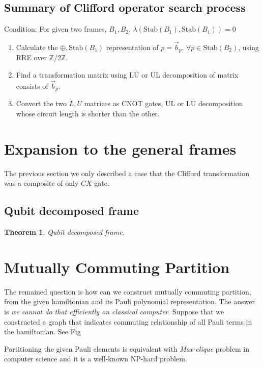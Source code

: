 \documentclass[a4paper,12pt]{article}
\newtheorem{theorem}{Theorem}
\begin{document}
\subsection{Summary of Clifford operator search process}

Condition: For given two frames, $B_1, B_2$, $\lambda(\mbox{Stab}(B_1), \mbox{Stab}(B_1)) = 0$

\begin{enumerate}
    \item Calculate the $\oplus, \mbox{Stab}(B_1)$ representation of $p = \vec{b}_p$, $\forall p \in \mbox{Stab}(B_2)$, using RRE over $\mathbb{Z}/2 \mathbb{Z}$.
    \item Find a transformation matrix using LU or UL decomposition of matrix consists of $\vec{b}_p$.
    \item Convert the two $L, U$ matrices as CNOT gates, UL or LU decomposition whose circuit length is shorter than the other.
\end{enumerate}

\section{Expansion to the general frames}

The previous section we only described a case that the Clifford transformation
was a composite of only $CX$ gate.

\subsection{Qubit decomposed frame}

\begin{theorem}
    Qubit decomposed frame.
\end{theorem}



\section{Mutually Commuting Partition}

The remained question is how can we construct mutually commuting partition, 
from the given hamiltonian and its Pauli polynomial representation.
The answer is \textit{we cannot do that efficiently on classical computer}.
Suppose that we constructed a graph that indicates commuting relationship
of all Pauli terms in the hamiltonian. See Fig %

Partitioning the given Pauli elements is equivalent with \textit{Max-clique}
problem in computer science and it is a well-known NP-hard problem\cite{karp_reducibility_1972}.
\end{document}
